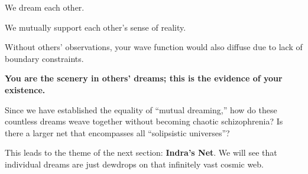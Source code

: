 We dream each other.

We mutually support each other's sense of reality.

Without others' observations, your wave function would also diffuse due to lack of boundary constraints.

\textbf{You are the scenery in others' dreams; this is the evidence of your existence.}

Since we have established the equality of ``mutual dreaming,'' how do these countless dreams weave together without becoming chaotic schizophrenia? Is there a larger net that encompasses all ``solipsistic universes''?

This leads to the theme of the next section: \textbf{Indra's Net}. We will see that individual dreams are just dewdrops on that infinitely vast cosmic web.

